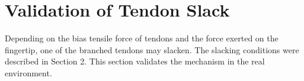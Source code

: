 \documentclass{llncs}
\begin{document}



\section{Validation of Tendon Slack} %
\label{sec:verification}
Depending on the bias tensile force of tendons and the force exerted on the fingertip,
one of the branched tendons may slacken.
The slacking conditions were described in Section 2.
This section validates the mechanism in the real environment.

\end{document}
